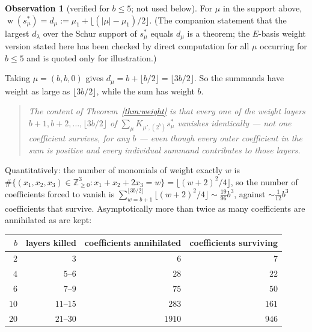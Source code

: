 \documentclass[10pt]{article}
\theoremstyle{plain}
\theoremstyle{definition}
\newtheorem{observation}[theorem]{Observation}
\newcommand{\bbZ}{\mathbb{Z}}
\newcommand{\wt}{\operatorname{w}}
\begin{document}
\begin{observation}[verified for $b\le5$; not used below]\label{obs:dmu}
For $\mu$ in the support above, $\wt(s^*_\mu)=d_\mu:=\mu_1+\lfloor(|\mu|-\mu_1)/2\rfloor$.
(The companion statement that the largest $d_\lambda$ over the Schur support of $s^*_\mu$
equals $d_\mu$ is a theorem; the $E$-basis weight version stated here has been checked by
direct computation for all $\mu$ occurring for $b\le5$ and is quoted only for
illustration.)
\end{observation}

Taking $\mu=(b,b,0)$ gives $d_\mu=b+\lfloor b/2\rfloor=\lfloor 3b/2\rfloor$. So the summands
have weight as large as $\lfloor 3b/2\rfloor$, while the sum has weight $b$.

\begin{quote}
\emph{The content of Theorem~\ref{thm:weight} is that every one of the weight layers
$b+1,b+2,\dots,\lfloor3b/2\rfloor$ of $\sum_\mu K_{\mu',(2^b)}s^*_\mu$ vanishes
identically --- not one coefficient survives, for any $b$ --- even though every outer
coefficient in the sum is positive and every individual summand contributes to those
layers.}
\end{quote}

Quantitatively: the number of monomials of weight exactly $w$ is
$\#\{(x_1,x_2,x_3)\in\bbZ_{\ge0}^3:x_1+x_2+2x_3=w\}=\lfloor (w+2)^2/4\rfloor$, so the number
of coefficients forced to vanish is $\sum_{w=b+1}^{\lfloor3b/2\rfloor}\lfloor(w+2)^2/4\rfloor
\sim\frac{19}{96}b^3$, against $\sim\frac1{12}b^3$ coefficients that survive. Asymptotically
more than twice as many coefficients are annihilated as are kept:

\begin{center}\small
\begin{tabular}{rrrr}
\toprule
$b$ & layers killed & coefficients annihilated & coefficients surviving\\
\midrule
$2$  & $3$        & $6$    & $7$\\
$4$  & $5$--$6$   & $28$   & $22$\\
$6$  & $7$--$9$   & $75$   & $50$\\
$10$ & $11$--$15$ & $283$  & $161$\\
$20$ & $21$--$30$ & $1910$ & $946$\\
\bottomrule
\end{tabular}
\end{center}
\end{document}
